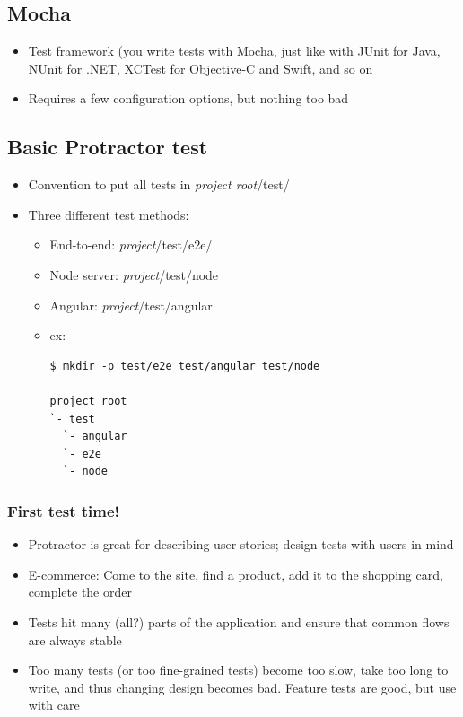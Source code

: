 \documentclass[british]{article}
\begin{document}
\subsection{Mocha}
\begin{itemize}
  \item Test framework (you write tests with Mocha, just like with JUnit for Java, NUnit for .NET, XCTest for Objective-C and Swift, and so on
  \item Requires a few configuration options, but nothing too bad
\end{itemize}

\subsection{Basic Protractor test}
\begin{itemize}
  \item Convention to put all tests in \textit{project root}/test/
  \item Three different test methods:
  \begin{itemize}
    \item End-to-end: \textit{project}/test/e2e/
    \item Node server: \textit{project}/test/node
    \item Angular: \textit{project}/test/angular
    \item ex:
      \begin{lstlisting}
$ mkdir -p test/e2e test/angular test/node

project root
`- test
  `- angular
  `- e2e
  `- node
      \end{lstlisting}
  \end{itemize}
\end{itemize}

\subsubsection{First test time!}
\begin{itemize}
  \item Protractor is great for describing user stories; design tests with users in mind
  \item E-commerce: Come to the site, find a product, add it to the shopping card, complete the order
  \item Tests hit many (all?) parts of the application and ensure that common flows are always stable
  \item Too many tests (or too fine-grained tests) become too slow, take too long to write, and thus changing design becomes bad. Feature tests are good, but use with care
\end{itemize}
\end{document}
